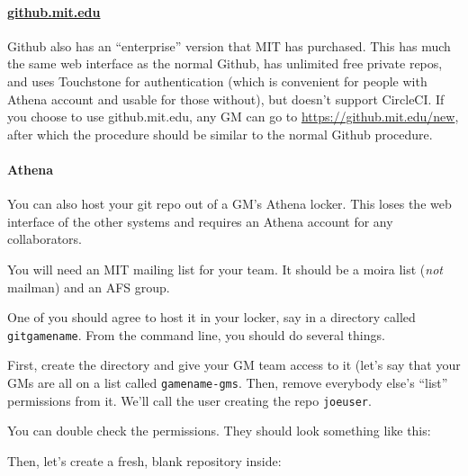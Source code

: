 \documentclass[green]{testgame}
\begin{document}
\paragraph*{\href{https://github.mit.edu}{github.mit.edu}} Github also has an ``enterprise'' version that MIT has purchased. This has much the same web interface as the normal Github, has unlimited free private repos, and uses Touchstone for authentication (which is convenient for people with Athena account and usable for those without), but doesn't support CircleCI. If you choose to use github.mit.edu, any GM can go to \url{https://github.mit.edu/new}, after which the procedure should be similar to the normal Github procedure.

\paragraph*{Athena} You can also host your git repo out of a GM's Athena locker. This loses the web interface of the other systems and requires an Athena account for any collaborators.

You will need an MIT mailing list for your team.  It should be a moira list (\emph{not} mailman) and an AFS group.


One of you should agree to host it in your locker, say in a directory called \texttt{gitgamename}. From the command line, you should do several things.

First, create the directory and give your GM team access to it (let's
say that your GMs are all on a list called \texttt{gamename-gms}. Then,
remove everybody else's ``list'' permissions from it. We'll call the
user creating the repo \texttt{joeuser}.


You can double check the permissions. They should look something like
this:


Then, let's create a fresh, blank repository inside:
\end{document}

